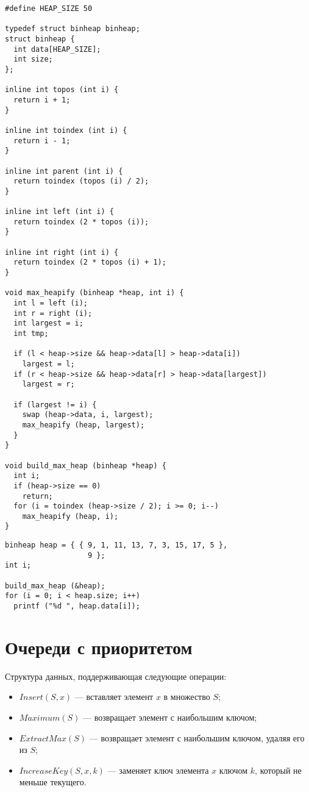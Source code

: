 \lstset{label=lst:binheap-impl,caption=Некоторые операции}
\begin{lstlisting}
#define HEAP_SIZE 50

typedef struct binheap binheap;
struct binheap {
  int data[HEAP_SIZE];
  int size;
};

inline int topos (int i) {
  return i + 1;
}

inline int toindex (int i) {
  return i - 1;
}

inline int parent (int i) {
  return toindex (topos (i) / 2);
}

inline int left (int i) {
  return toindex (2 * topos (i));
}

inline int right (int i) {
  return toindex (2 * topos (i) + 1);
}

void max_heapify (binheap *heap, int i) {
  int l = left (i);
  int r = right (i);
  int largest = i;
  int tmp;

  if (l < heap->size && heap->data[l] > heap->data[i])
    largest = l;
  if (r < heap->size && heap->data[r] > heap->data[largest])
    largest = r;

  if (largest != i) {
    swap (heap->data, i, largest);
    max_heapify (heap, largest);
  }
}

void build_max_heap (binheap *heap) {
  int i;
  if (heap->size == 0)
    return;
  for (i = toindex (heap->size / 2); i >= 0; i--)
    max_heapify (heap, i);
}
\end{lstlisting}

\lstset{label=lst:binheap-usage,caption=Пример использования}
\begin{lstlisting}
binheap heap = { { 9, 1, 11, 13, 7, 3, 15, 17, 5 },
                   9 };
int i;

build_max_heap (&heap);
for (i = 0; i < heap.size; i++)
  printf ("%d ", heap.data[i]);
\end{lstlisting}

\section{Очереди с приоритетом}
\label{sec:priority-queues}

Структура данных, поддерживающая следующие операции:
\begin{itemize}
  \item $Insert(S, x)$ --- вставляет элемент $x$ в множество $S$;
  \item $Maximum(S)$ --- возвращает элемент с наибольшим ключом;
  \item $ExtractMax(S)$ --- возвращает элемент с наибольшим ключом, удаляя его из $S$;
  \item $IncreaseKey(S, x, k)$ --- заменяет ключ элемента $x$ ключом $k$, который не меньше текущего.
\end{itemize}

